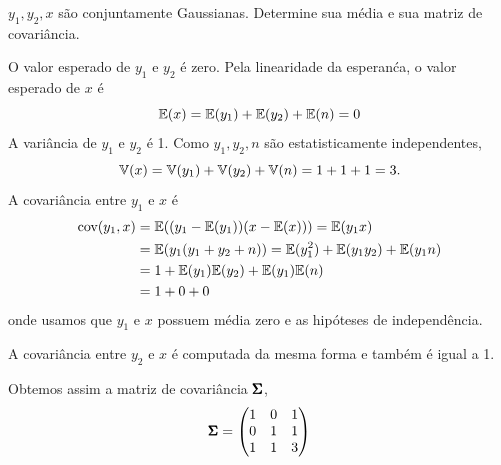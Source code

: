 \begin{exenumerate}
    
    \item $y_1, y_2, x$ s\~ao conjuntamente Gaussianas. Determine sua m\'edia e sua
    matriz de covari\^ancia.
    
    \begin{solution}
        
        O valor esperado de $y_1$ e $y_2$ \'e zero. Pela linearidade da
        esperan\'ca, o valor esperado de $x$ \'e
        \begin{equation}
            \mathbb{E}(x) = \mathbb{E}(y_1) + \mathbb{E}(y_2) + \mathbb{E}(n) = 0
        \end{equation}
        A vari\^ancia de $y_1$ e $y_2$ \'e 1. Como $y_1, y_2, n$ s\~ao estatisticamente independentes,
        \begin{equation}
            \mathbb{V}(x) = \mathbb{V}(y_1) + \mathbb{V}(y_2) + \mathbb{V}(n) = 1 + 1 + 1 = 3.
        \end{equation}
        A covari\^ancia entre $y_1$ e $x$ \'e
        \begin{align}
            \text{cov}(y_1, x) &= \mathbb{E}( (y_1-\mathbb{E}(y_1))(x-\mathbb{E}(x))) = \mathbb{E}( y_1 x) \\
            &= \mathbb{E}( y_1(y_1+y_2+n) ) = \mathbb{E}(y_1^2) + \mathbb{E}(y_1 y_2) + \mathbb{E}(y_1 n)\\
            &= 1 +  \mathbb{E}(y_1)\mathbb{E}(y_2) + \mathbb{E}(y_1)\mathbb{E}(n)\\
            &= 1 + 0 + 0
        \end{align}
        onde usamos que $y_1$ e $x$ possuem m\'edia zero e as hip\'oteses de independ\^encia.
        
        A covari\^ancia entre $y_2$ e $x$ \'e computada da mesma forma e tamb\'em \'e igual a 1.
        
        Obtemos assim a matriz de covari\^ancia $\pmb{\Sigma}$,
        \begin{equation}
            \pmb{\Sigma} = \begin{pmatrix}
                1 & 0 & 1\\
                0 & 1 & 1\\
                1 & 1 & 3
            \end{pmatrix}
        \end{equation}
        
    \end{solution}
    

\end{exenumerate}
